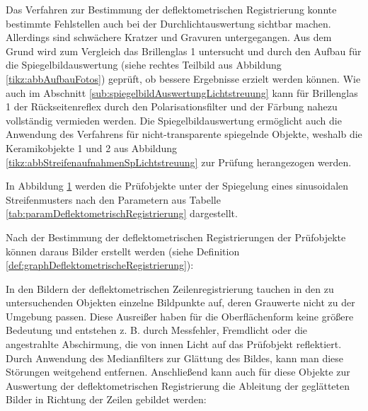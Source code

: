Das Verfahren zur Bestimmung der deflektometrischen Registrierung konnte bestimmte Fehlstellen auch bei der Durchlichtauswertung sichtbar machen.
Allerdings sind schwächere Kratzer und Gravuren untergegangen.
Aus dem Grund wird zum Vergleich das Brillenglas 1 untersucht und durch den Aufbau für die Spiegelbildauswertung (siehe rechtes Teilbild aus Abbildung \ref{tikz:abbAufbauFotos}) geprüft, ob bessere Ergebnisse erzielt werden können.
Wie auch im Abschnitt \ref{sub:spiegelbildAuswertungLichtstreuung} kann für Brillenglas 1 der Rückseitenreflex durch den Polarisationsfilter und der Färbung nahezu vollständig vermieden werden.
Die Spiegelbildauswertung ermöglicht auch die Anwendung des Verfahrens für nicht-transparente spiegelnde Objekte, weshalb die Keramikobjekte 1 und 2 aus Abbildung \ref{tikz:abbStreifenaufnahmenSpLichtstreuung} zur Prüfung herangezogen werden.

\p
In Abbildung \ref{tikz:abbSinusStreifenmusterSpiegel} werden die Prüfobjekte unter der Spiegelung eines sinusoidalen Streifenmusters nach den Parametern aus Tabelle \ref{tab:paramDeflektometrischRegistrierung} dargestellt.

{
	\begin{figure}[H]
		\centering
		
		\label{tikz:abbSinusStreifenmusterSpiegel}
	\end{figure}
}

\noindent
Nach der Bestimmung der deflektometrischen Registrierungen der Prüfobjekte können daraus Bilder erstellt werden (siehe Definition \ref{def:graphDeflektometrischeRegistrierung}):

{
	\begin{figure}[H]
		\centering
		
		\label{tikz:abbDeflectometricRegistrationsSpiegel}
	\end{figure}
}

\noindent
In den Bildern der deflektometrischen Zeilenregistrierung tauchen in den zu untersuchenden Objekten einzelne Bildpunkte auf, deren Grauwerte nicht zu der Umgebung passen.
Diese Ausreißer haben für die Oberflächenform keine größere Bedeutung und entstehen z. B. durch Messfehler, Fremdlicht oder die angestrahlte Abschirmung, die von innen Licht auf das Prüfobjekt reflektiert.
Durch Anwendung des Medianfilters zur Glättung des Bildes, kann man diese Störungen weitgehend entfernen.
Anschließend kann auch für diese Objekte zur Auswertung der deflektometrischen Registrierung die Ableitung der geglätteten Bilder in Richtung der Zeilen gebildet werden:

